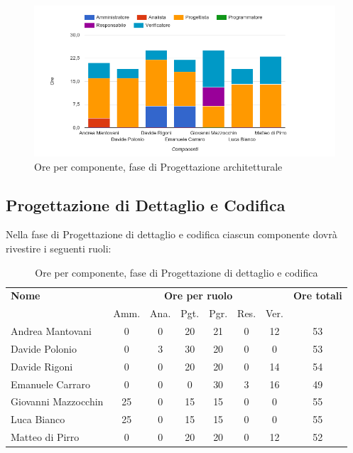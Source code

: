    \begin{figure}[H]
      \begin{center}
        \includegraphics[width=12cm]{res/img/orePerComponenteProgettazioneArchitetturale.png}
      \caption{Ore per componente, fase di Progettazione architetturale}
      \end{center} 
    \end{figure}    
    
    
    
    
\pagebreak
\subsection{Progettazione di Dettaglio e Codifica}
Nella fase di Progettazione di dettaglio e codifica ciascun componente dovrà rivestire i seguenti ruoli:

\begin{table}[H]
\begin{tabular}{lccccccc}
\toprule
    \textbf{Nome}  & \multicolumn{6}{c}{\textbf{Ore per ruolo}} & \textbf{Ore totali} \\
     & Amm. & Ana. & Pgt. & Pgr. & Res. & Ver. & \\
    \midrule
    
	   Andrea Mantovani & 0 & 0 & 20 & 21 & 0 & 12 & 53 \\
	     Davide Polonio & 0 & 3 & 30 & 20 & 0 & 0 & 53 \\
	      Davide Rigoni & 0 & 0 & 20 & 20 & 0 & 14 & 54 \\
	   Emanuele Carraro & 0 & 0 & 0 & 30 & 3 & 16 & 49 \\
	Giovanni Mazzocchin & 25 & 0 & 15 & 15 & 0 & 0 & 55 \\
	        Luca Bianco & 25 & 0 & 15 & 15 & 0 & 0 & 55 \\
	    Matteo di Pirro & 0 & 0 & 20 & 20 & 0 & 12 & 52 \\
    
    
    \bottomrule
\end{tabular}
\caption{Ore per componente, fase di Progettazione di dettaglio e codifica}
\end{table}

